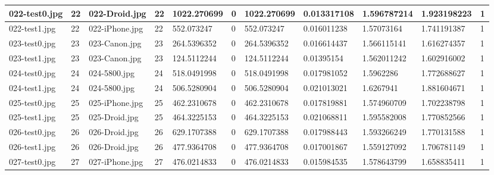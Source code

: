 \begin{landscape}
\begin{longtable}{|p{2cm}|p{1cm}|p{2cm}|p{1cm}|p{2cm}|p{1cm}|p{2cm}|p{2cm}|p{2cm}|p{2cm}|p{1cm}|}
	\hline
	022-test0.jpg & 22       & 022-Droid.jpg  & 22                   & 1022.270699   & 0                & 1022.270699         & 0.013317108   & 1.596787214   & 1.923198223       & 1         \\ 
	\hline
	022-test1.jpg & 22       & 022-iPhone.jpg & 22                   & 552.073247    & 0                & 552.073247          & 0.016011238   & 1.57073164    & 1.741191387       & 1         \\ 
	\hline
	023-test0.jpg & 23       & 023-Canon.jpg  & 23                   & 264.5396352   & 0                & 264.5396352         & 0.016614437   & 1.566115141   & 1.616274357       & 1         \\ 
	\hline
	023-test1.jpg & 23       & 023-Canon.jpg  & 23                   & 124.5112244   & 0                & 124.5112244         & 0.01395154    & 1.562011242   & 1.602916002       & 1         \\ 
	\hline
	024-test0.jpg & 24       & 024-5800.jpg   & 24                   & 518.0491998   & 0                & 518.0491998         & 0.017981052   & 1.5962286     & 1.772688627       & 1         \\ 
	\hline
	024-test1.jpg & 24       & 024-5800.jpg   & 24                   & 506.5280904   & 0                & 506.5280904         & 0.021013021   & 1.6267941     & 1.881604671       & 1         \\ 
	\hline
	025-test0.jpg & 25       & 025-iPhone.jpg & 25                   & 462.2310678   & 0                & 462.2310678         & 0.017819881   & 1.574960709   & 1.702238798       & 1         \\ 
	\hline
	025-test1.jpg & 25       & 025-Droid.jpg  & 25                   & 464.3225153   & 0                & 464.3225153         & 0.021068811   & 1.595582008   & 1.770852566       & 1         \\ 
	\hline
	026-test0.jpg & 26       & 026-Droid.jpg  & 26                   & 629.1707388   & 0                & 629.1707388         & 0.017988443   & 1.593266249   & 1.770131588       & 1         \\ 
	\hline
	026-test1.jpg & 26       & 026-Droid.jpg  & 26                   & 477.9364708   & 0                & 477.9364708         & 0.017001867   & 1.559127092   & 1.706781149       & 1         \\ 
	\hline
	027-test0.jpg & 27       & 027-iPhone.jpg & 27                   & 476.0214833   & 0                & 476.0214833         & 0.015984535   & 1.578643799   & 1.658835411       & 1         \\ 

\end{longtable}
\end{landscape}
